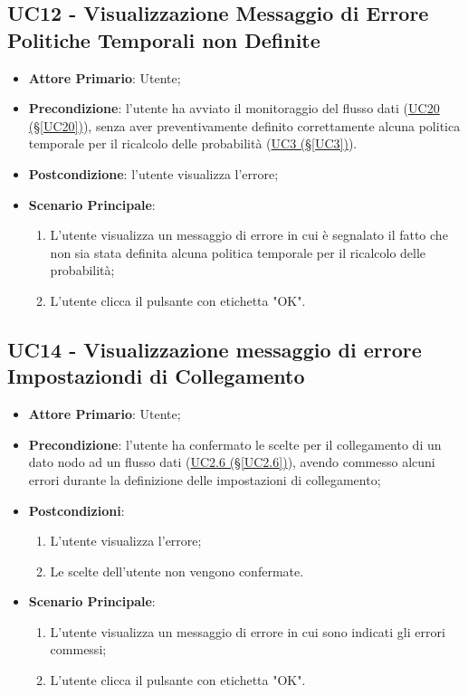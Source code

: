 \pagebreak

\subsection{UC12 - Visualizzazione Messaggio di Errore Politiche Temporali non Definite}\label{UC12}
\begin{itemize}
\item \textbf{Attore Primario}: Utente;
\item \textbf{Precondizione}: l'utente ha avviato il monitoraggio del flusso dati (\hyperref[UC20]{UC20 							(§\ref*{UC20})}), senza aver preventivamente definito correttamente alcuna politica temporale per il ricalcolo delle probabilità (\hyperref[UC3]{UC3 (§\ref*{UC3})}).
\item \textbf{Postcondizione}: l'utente visualizza l'errore;
\item \textbf{Scenario Principale}: 
	\begin{enumerate}
	\item L'utente visualizza un messaggio di errore in cui è segnalato il fatto che non sia stata definita alcuna 				politica temporale per il ricalcolo delle probabilità;
	\item L'utente clicca il pulsante con etichetta "OK".
	\end{enumerate}
\end{itemize}

\newpage

\subsection{UC14 - Visualizzazione messaggio di errore Impostaziondi di Collegamento}\label{UC14}
\begin{itemize}
\item \textbf{Attore Primario}: Utente;
\item \textbf{Precondizione}: l'utente ha confermato le scelte per il collegamento di un dato nodo ad un flusso 				dati (\hyperref[UC2.6]{UC2.6 (§\ref*{UC2.6})}), avendo commesso alcuni errori durante la definizione delle impostazioni di collegamento;
\item \textbf{Postcondizioni}: 
	\begin{enumerate}
	\item L'utente visualizza l'errore;
	\item Le scelte dell'utente non vengono confermate.
	\end{enumerate}
\item \textbf{Scenario Principale}: 
	\begin{enumerate}
	\item L'utente visualizza un messaggio di errore in cui sono indicati gli errori commessi;
	\item L'utente clicca il pulsante con etichetta "OK".
	\end{enumerate}
\end{itemize}

